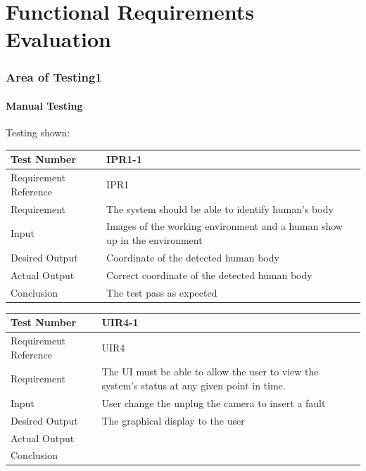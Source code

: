 \documentclass[12pt, titlepage]{article}
\begin{document}
\section{Functional Requirements Evaluation}

\subsubsection{Area of Testing1}
		
\paragraph{Manual Testing}{Testing shown:}
\begin{table}[H]
\begin{center}
\begin{tabular}{|l | m{9cm}|}
\hline
  Test Number & IPR1-1\\
  \hline
  Requirement Reference & IPR1\\
  \hline
  Requirement &  The system should be able to identify human’s body\\
  \hline
  Input & Images of the working environment and a human show up in
the environment\\
  \hline
  Desired Output & Coordinate of the detected human body\\
  \hline
  Actual Output & Correct coordinate of the detected human body\\
  \hline
  Conclusion & The test pass as expected\\
  \hline
\end{tabular}
\end{center}           
\end{table}

\begin{table}[H]
\begin{center}
\begin{tabular}{|l | m{9cm}|}
\hline
  Test Number & UIR4-1\\
  \hline
  Requirement Reference & UIR4\\
  \hline
  Requirement &  The UI must be able to allow the user to view the system’s status at any given point in time.\\
  \hline
  Input & User change the unplug the camera to insert a fault\\
  \hline
  Desired Output & The graphical display to the user\\
  \hline
  Actual Output & \\
  \hline
  Conclusion & \\
  \hline
\end{tabular}
\end{center}           
\end{table}
\end{document}
